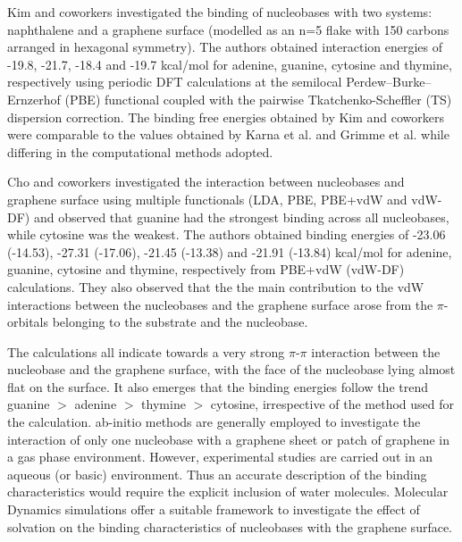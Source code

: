 Kim and coworkers investigated the binding of nucleobases with two systems: naphthalene and a graphene surface (modelled as an n=5 flake with 150 carbons arranged in hexagonal symmetry).\supercite{cho_noncovalent_2013} The authors obtained interaction energies of -19.8, -21.7, -18.4 and -19.7 kcal/mol for adenine, guanine, cytosine and thymine, respectively using periodic DFT calculations at the semilocal Perdew–Burke–Ernzerhof (PBE) functional coupled with the pairwise Tkatchenko-Scheffler (TS) dispersion correction. The binding free energies obtained by Kim and coworkers were comparable to the values obtained by Karna et al.\supercite{gowtham_physisorption_2007} and Grimme et al.\supercite{antony_structures_2008} while differing in the computational methods adopted.

Cho and coworkers investigated the interaction between nucleobases and graphene surface using multiple functionals (LDA, PBE, PBE+vdW and vdW-DF) and observed that guanine had the strongest binding across all nucleobases, while cytosine was the weakest.\supercite{lee_physisorption_2013} The authors obtained binding energies of -23.06 (-14.53), -27.31 (-17.06),  -21.45 (-13.38) and  -21.91 (-13.84) kcal/mol for adenine, guanine, cytosine and thymine, respectively from PBE+vdW (vdW-DF) calculations. They also observed that the the main contribution to the vdW interactions between the nucleobases and the graphene surface arose from the $\pi$-orbitals belonging to the substrate and the nucleobase.

The calculations all indicate towards a very strong $\pi$-$\pi$ interaction between the nucleobase and the graphene surface, with the face of the nucleobase lying almost flat on the surface.\supercite{cho_noncovalent_2013,antony_structures_2008,umadevi_quantum_2011,vovusha_adsorption_2015,bhai_probing_2020,lee_physisorption_2013,le_physisorption_2012,panigrahi_interaction_2012,cortes-arriagada_intermolecular_2021,cortes-arriagada_phosphorene_2018} It also emerges that the binding energies follow the trend guanine $>$ adenine $>$ thymine $>$ cytosine, irrespective of the method used for the calculation. ab-initio methods are generally employed to investigate the interaction of only one nucleobase with a graphene sheet or patch of graphene in a gas phase environment. However, experimental studies are carried out in an aqueous (or basic) environment. Thus an accurate description of the binding characteristics would require the explicit inclusion of water molecules. Molecular Dynamics simulations offer a suitable framework to investigate the effect of solvation on the binding characteristics of nucleobases with the graphene surface.

